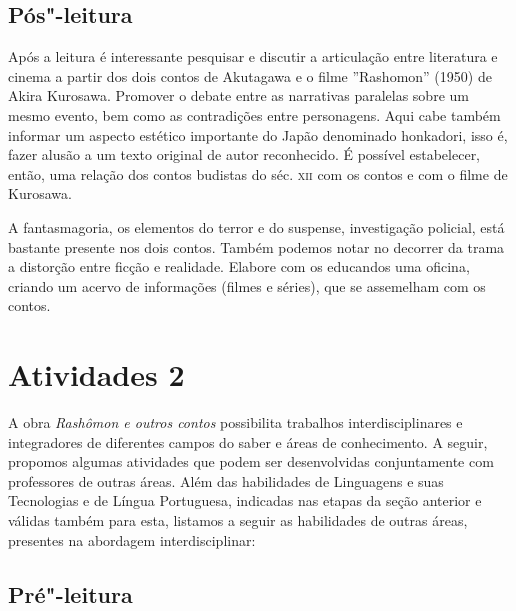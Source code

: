 \documentclass[12pt]{extarticle}
\begin{document}
\subsection{Pós"-leitura}


Após a leitura é interessante pesquisar e discutir a
articulação entre literatura e cinema a partir dos dois contos de
Akutagawa e o filme ''Rashomon'' (1950) de Akira Kurosawa. Promover o
debate entre as narrativas paralelas sobre um mesmo evento, bem como as
contradições entre personagens. Aqui cabe também informar um aspecto
estético importante do Japão denominado honkadori, isso é, fazer alusão
a um texto original de autor reconhecido. É possível estabelecer, então,
uma relação dos contos budistas do séc. \textsc{xii} com os contos e com o filme
de Kurosawa.


A fantasmagoria, os elementos do terror e do suspense, investigação
policial, está bastante presente nos dois contos. Também podemos notar
no decorrer da trama a distorção entre ficção e realidade. Elabore com
os educandos uma oficina, criando um acervo de informações (filmes e
séries), que se assemelham com os contos.


\section{Atividades 2}

A obra \emph{Rashômon e outros contos} possibilita trabalhos
interdisciplinares e integradores de diferentes campos do saber e áreas
de conhecimento. A seguir, propomos algumas atividades que podem ser
desenvolvidas conjuntamente com professores de outras áreas. Além das
habilidades de Linguagens e suas Tecnologias e de Língua Portuguesa,
indicadas nas etapas da seção anterior e válidas também para esta,
listamos a seguir as habilidades de outras áreas, presentes na abordagem
interdisciplinar:



\subsection{Pré"-leitura}
\end{document}
